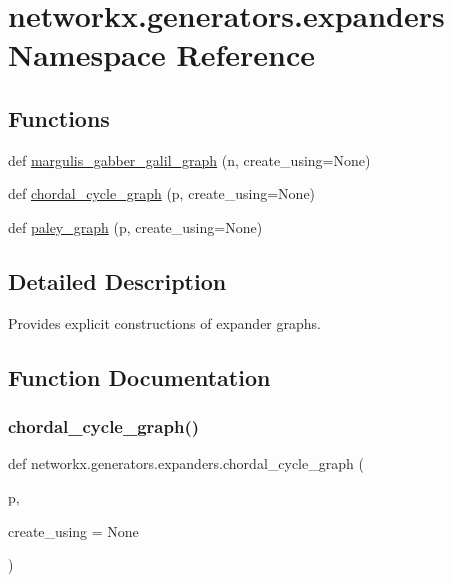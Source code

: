 \hypertarget{namespacenetworkx_1_1generators_1_1expanders}{}\section{networkx.\+generators.\+expanders Namespace Reference}
\label{namespacenetworkx_1_1generators_1_1expanders}
\subsection*{Functions}
\begin{DoxyCompactItemize}
\item 
def \hyperlink{namespacenetworkx_1_1generators_1_1expanders_a204030818d78155592a8ff328a5a9b4f}{margulis\+\_\+gabber\+\_\+galil\+\_\+graph} (n, create\+\_\+using=None)
\item 
def \hyperlink{namespacenetworkx_1_1generators_1_1expanders_aad65c0f92737507dfba4627b530aabc1}{chordal\+\_\+cycle\+\_\+graph} (p, create\+\_\+using=None)
\item 
def \hyperlink{namespacenetworkx_1_1generators_1_1expanders_a3429b524be3e3562c2e3f2f60fc7dd0e}{paley\+\_\+graph} (p, create\+\_\+using=None)
\end{DoxyCompactItemize}


\subsection{Detailed Description}
\begin{DoxyVerb}Provides explicit constructions of expander graphs.\end{DoxyVerb}
 

\subsection{Function Documentation}
\mbox{\label{namespacenetworkx_1_1generators_1_1expanders_aad65c0f92737507dfba4627b530aabc1}} 
\subsubsection{\texorpdfstring{chordal\+\_\+cycle\+\_\+graph()}{chordal\_cycle\_graph()}}
{\footnotesize\ttfamily def networkx.\+generators.\+expanders.\+chordal\+\_\+cycle\+\_\+graph (\begin{DoxyParamCaption}\item[{}]{p,  }\item[{}]{create\+\_\+using = {\ttfamily None} }\end{DoxyParamCaption})}

